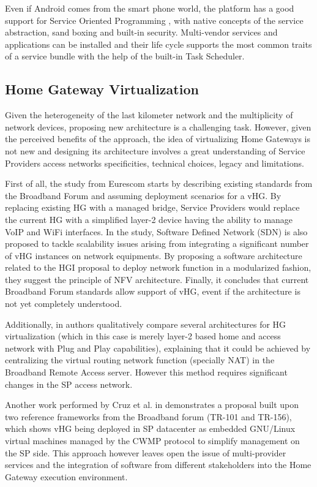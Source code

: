 Even if Android comes from the smart phone world, the platform has a good support for Service Oriented Programming \cite{bieber2001introduction}, with native concepts of the service abstraction, sand boxing and built-in security. Multi-vendor services and applications can be installed and their life cycle supports the most common traits of a service bundle with the help of the built-in Task Scheduler.

\subsection{Home Gateway Virtualization}
Given the heterogeneity of the last kilometer network and the multiplicity of network devices, proposing new architecture is a challenging task.
However, given the perceived benefits of the approach, the idea of virtualizing Home Gateways is not new and designing  its architecture involves a great understanding of Service Providers access networks specificities, technical choices, legacy and limitations.

First of all, the study from Eurescom \cite{daniel_abgrall_virtual_????} starts by describing existing standards from the Broadband Forum and assuming deployment scenarios for a vHG.
By replacing existing HG with a managed bridge, Service Providers would replace the current HG with a simplified layer-2 device having the ability to manage VoIP and WiFi interfaces.
In the study, Software Defined Network (SDN) \cite{kim_improving_2013} is also proposed to tackle scalability issues arising from integrating a significant number of vHG instances on network equipments.
By proposing a software architecture related to the HGI proposal to deploy network function in a modularized fashion, they suggest the principle of NFV architecture.
Finally,  it concludes that current Broadband Forum standards allow support of vHG, event if the architecture is not yet completely understood.

Additionally, in \cite{da_silva_home_2011} authors qualitatively compare several architectures for HG virtualization (which in this case is merely layer-2 based home and access network with Plug and Play capabilities), explaining that it could be achieved by centralizing the virtual routing network function (specially NAT) in the Broadband Remote Access server. However this method requires significant changes in the SP access network.

Another work performed by Cruz et al. in \cite{cruz_architecture_2013} demonstrates a proposal built upon two reference frameworks from the Broadband forum (TR-101 and TR-156), which shows vHG being deployed in SP datacenter as embedded GNU/Linux virtual machines managed by the CWMP protocol to simplify management on the SP side. This approach however leaves open the issue of multi-provider services and the integration of software from different stakeholders into the Home Gateway execution environment.

